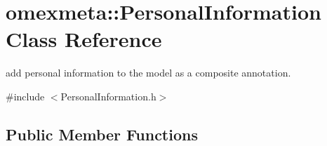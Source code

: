 \hypertarget{classomexmeta_1_1PersonalInformation}{}\section{omexmeta\+:\+:Personal\+Information Class Reference}
\label{classomexmeta_1_1PersonalInformation}


add personal information to the model as a composite annotation.  




{\ttfamily \#include $<$Personal\+Information.\+h$>$}

\subsection*{Public Member Functions}
